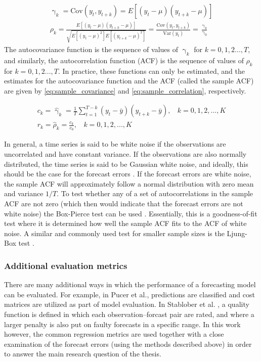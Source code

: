 \begin{gather}
     \upgamma_k = \text{Cov}(y_t, y_{t+k}) = E[(y_t - \mu)(y_{t+k} - \mu)] \label{eq:covariance} \\[1ex]
     \rho_k = \frac{E[(y_t - \mu)(y_{t+k} - \mu)]}{\sqrt{E[(y_t - \mu)^2]E[(y_{t+k} - \mu)^2]}} = \frac{\text{Cov}(y_t, y_{t+k})}{\text{Var}(y_t)} = \frac{\upgamma_k}{\upgamma_0}\label{eq:correlation}
\end{gather}
The autocovariance function is the sequence of values of $\upgamma_k$ for $k=0,1,2 ..., T$, and similarly, the autocorrelation function (ACF) is the sequence of values of $\rho_k$ for $k=0,1,2 ..., T$. In practice, these functions can only be estimated, and the estimates for the autocovariance function and the ACF (called the sample ACF) are given by \cref{eq:sample_covariance} and \cref{eq:sample_correlation}, respectively.

\begin{gather}
     c_k=\hat{\upgamma}_k = \frac{1}{T} \sum_{t=1}^{T-k} (y_t - \bar{y})(y_{t+k} - \bar{y}), \:\:\:\: k = 0,1,2,...,K \label{eq:sample_covariance} \\[1ex]
     r_k = \hat{\rho}_k = \frac{c_k}{c_0}, \:\:\:\: k = 0,1,2,...,K \label{eq:sample_correlation}
\end{gather}

In general, a time series is said to be white noise if the observations are uncorrelated and have constant variance. If the observations are also normally distributed, the time series is said to be Gaussian white noise, and ideally, this should be the case for the forecast errors \cite{Montgomery2015}. If the forecast errors are white noise, the sample ACF will approximately follow a normal distribution with zero mean and variance $1/T$. To test whether any of a set of autocorrelations in the sample ACF are not zero (which then would indicate that the forecast errors are not white noise) the Box-Pierce test can be used \cite{Montgomery2015}. Essentially, this is a goodness-of-fit test where it is determined how well the sample ACF fits to the ACF of white noise. A similar and commonly used test for smaller sample sizes is the Ljung-Box test \cite{Montgomery2015}.

\subsubsection{Additional evaluation metrics}
There are many additional ways in which the performance of a forecasting model can be evaluated. For example, in Pucer et al.\cite{FaganeliPucer2018}, predictions are classified and cost matrices are utilized as part of model evaluation. In Stablober et al. \cite{Stadlober2008}, a quality function is defined in which each observation--forcast pair are rated, and where a larger penalty is also put on faulty forecasts in a specific range. In this work however, the common regression metrics are used together with a close examination of the forecast errors (using the methods described above) in order to answer the main research question of the thesis.  

